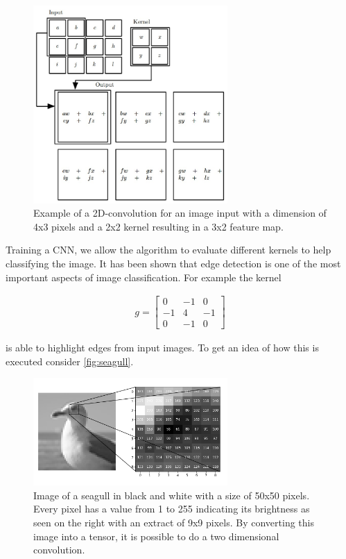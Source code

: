 \begin{figure}[ht]
 \centering
 \includegraphics[width=0.66\textwidth]{images/Chapter2/tensor_conv.jpg}
 \caption{Example of a 2D-convolution for an image input with a dimension of 4x3 pixels and a 2x2 kernel resulting in a 3x2 feature map. \citep{Goodfellow-et-al-2016}} 
 \label{fig:conv_ex}
\end{figure}

Training a CNN, we allow the algorithm to evaluate different kernels to help classifying the image. It has been shown that edge detection is one of the most important aspects of image classification. For example the kernel 

\begin{gather}
    g = \begin{bmatrix}
0 & -1 & 0\\
-1 & 4 & -1 \\
0 & -1 & 0
\end{bmatrix}
\end{gather}

is able to highlight edges from input images. To get an idea of how this is executed consider \autoref{fig:seagull}.


\begin{figure}[ht]
 \centering
 \includegraphics[width=0.66\textwidth]{images/Chapter2/eye_array.png}
 \caption{Image of a seagull in black and white with a size of 50x50 pixels. Every pixel has a value from 1 to 255 indicating its brightness as seen on the right with an extract of 9x9 pixels. By converting this image into a tensor, it is possible to do a two dimensional convolution.} 
 \label{fig:seagull}
\end{figure}
\newpage

